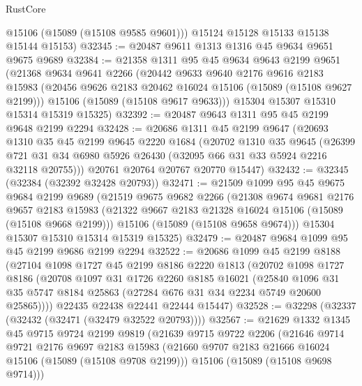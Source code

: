 \begin{lexlean}{RustCore}
\begin{coremodule}
        @15106
        (@15089 (@15108 @9585 @9601)))
      @15124
      @15128
      @15133
      @15138
      @15144
      @15153)
@32345 := @20487 @9611 @1313 @1316 @45 @9634 @9651 @9675 @9689
@32384 := @21358
    @1311
    @95
    @45
    @9634
    @9643
    @2199
    @9651
    (@21368
      @9634
      @9641
      @2266
      (@20442
        @9633
        @9640
        @2176
        @9616
        @2183
        @15983
        (@20456 @9626 @2183 @20462 @16024 @15106 (@15089 (@15108 @9627 @2199)))
        @15106
        (@15089 (@15108 @9617 @9633)))
      @15304
      @15307
      @15310
      @15314
      @15319
      @15325)
@32392 := @20487 @9643 @1311 @95 @45 @2199 @9648 @2199 @2294
@32428 := @20686
    @1311
    @45
    @2199
    @9647
    (@20693
      @1310
      @35
      @45
      @2199
      @9645
      @2220
      @1684
      (@20702
        @1310
        @35
        @9645
        (@26399 @721 @31 @34 @6980 @5926 @26430 (@32095 @66 @31 @33 @5924 @2216 @32118 @20755)))
      @20761
      @20764
      @20767
      @20770
      @15447)
@32432 := @32345 (@32384 (@32392 @32428 @20793))
@32471 := @21509
    @1099
    @95
    @45
    @9675
    @9684
    @2199
    @9689
    (@21519
      @9675
      @9682
      @2266
      (@21308
        @9674
        @9681
        @2176
        @9657
        @2183
        @15983
        (@21322 @9667 @2183 @21328 @16024 @15106 (@15089 (@15108 @9668 @2199)))
        @15106
        (@15089 (@15108 @9658 @9674)))
      @15304
      @15307
      @15310
      @15314
      @15319
      @15325)
@32479 := @20487 @9684 @1099 @95 @45 @2199 @9686 @2199 @2294
@32522 := @20686
    @1099
    @45
    @2199
    @8188
    (@27104
      @1098
      @1727
      @45
      @2199
      @8186
      @2220
      @1813
      (@20702
        @1098
        @1727
        @8186
        (@20708
          @1097
          @31
          @1726
          @2260
          @8185
          @16021
          (@25840
            @1096
            @31
            @35
            @5747
            @8184
            @25863
            (@27284 @676 @31 @34 @2234 @5749 @20600 @25865))))
      @22435
      @22438
      @22441
      @22444
      @15447)
@32528 := @32298 (@32337 (@32432 (@32471 (@32479 @32522 @20793))))
@32567 := @21629
    @1332
    @1345
    @45
    @9715
    @9724
    @2199
    @9819
    (@21639
      @9715
      @9722
      @2206
      (@21646
        @9714
        @9721
        @2176
        @9697
        @2183
        @15983
        (@21660 @9707 @2183 @21666 @16024 @15106 (@15089 (@15108 @9708 @2199)))
        @15106
        (@15089 (@15108 @9698 @9714)))

\end{coremodule}
\end{lexlean}
